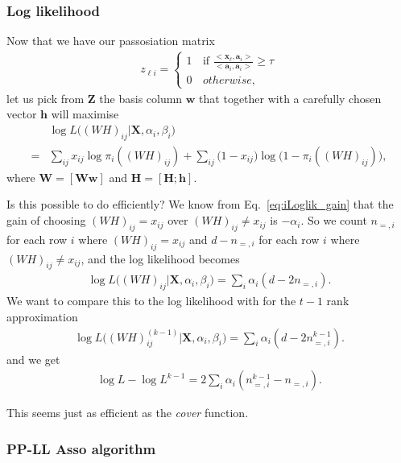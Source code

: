 \documentclass[12pt]{article}
\begin{document}
\subsubsection*{Log likelihood} %

Now that we have our passosiation matrix
\begin{align} \label{eq:PAssociation}
  z_{\ell i} =
   \begin{cases}
      1 & \text{if }  \frac{<\mathbf{x}_{\ell}, \mathbf{a}_i>}{<\mathbf{a}_{i},\mathbf{a}_{i}>} \geq \tau \\
      0 \, &otherwise,
    \end{cases}
\end{align}
let us pick from $\mathbf{Z}$ the basis column $\mathbf{w}$ that together with a carefully chosen vector $\mathbf{h}$ will maximise
\begin{align}
 & \log L \big ((WH)_{ij}|\mathbf{X}, \alpha_{i}, \beta_{i} \big ) \\
 =& \sum_{i j}x_{ij} \log  \pi_i((WH)_{ij})+ \sum_{i j} \big (1 - x_{ij} \big)\log  \big ( 1 - \pi_i((WH)_{ij}) \big), \nonumber
\end{align}
where $\mathbf{W} = [\mathbf{W} \mathbf{w}]$ and  $\mathbf{H} = [\mathbf{H}; \mathbf{h}]$.

Is this possible to do efficiently?
We know from Eq.~\ref{eq:iLoglik_gain} that the gain of choosing $(WH)_{ij} = x_{ij}$ over $(WH)_{ij} \neq x_{ij}$ is $-\alpha_i$.
So we count $n_{=,i}$  for each row $i$ where $(WH)_{ij} = x_{ij}$ and $d- n_{=,i} $ for each row $i$ where  $(WH)_{ij} \neq x_{ij}$, and the log likelihood becomes
\begin{align}
 \log L \big ((WH)_{ij}|\mathbf{X}, \alpha_{i}, \beta_{i} \big ) =\sum_{i} \alpha_i (d - 2 n_{=,i}).
\end{align}
We want to compare this to the log likelihood with for the $t-1$ rank approximation
\begin{align}
 \log L \big ((WH)^{(k-1)}_{ij}|\mathbf{X}, \alpha_{i}, \beta_{i} \big ) =\sum_{i} \alpha_i (d - 2 n^{k-1}_{=,i}).
\end{align}
and we get
\begin{align}
 \log L - \log L^{k-1} = 2 \sum_{i} \alpha_i ( n^{k-1}_{=,i} - n_{=,i}).
\end{align}

This seems just as efficient as the {\it cover} function.

\subsubsection*{PP-LL Asso algorithm} %
\end{document}
